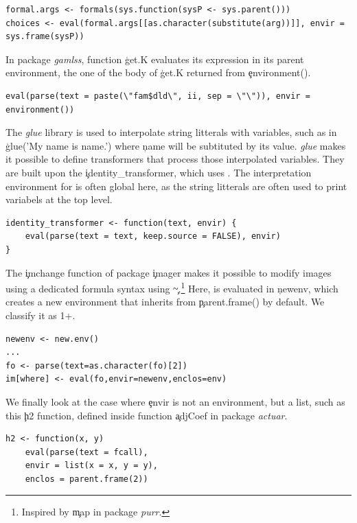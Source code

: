 \documentclass[conference]{IEEEtran}
\begin{document}
\begin{lstlisting}[label=code:matchargenvir, caption={\c{match.arg} using \eval with a custom environment.}]
formal.args <- formals(sys.function(sysP <- sys.parent()))
choices <- eval(formal.args[[as.character(substitute(arg))]], envir = sys.frame(sysP))
\end{lstlisting}

In package \emph{gamlss}, function \c{get.K} evaluates its expression in its parent environment, the one of the body of \c{get.K} returned from \c{environment()}.

\begin{lstlisting}
eval(parse(text = paste(\"fam$dld\", ii, sep = \"\")), envir = environment())
\end{lstlisting}


The \emph{glue} library is used to interpolate string litterals with variables, such as in \c{glue('My name is {name}.')} where \c{name} will be subtituted by its value. \emph{glue} makes it possible to define transformers that process those interpolated variables. They are built upon the \c{identity_transformer}, which uses \eval. The interpretation environment for \eval is often global here, as the string litterals are often used to print variabels at the top level.

\begin{lstlisting}
identity_transformer <- function(text, envir) {
    eval(parse(text = text, keep.source = FALSE), envir)
}
\end{lstlisting}


The \c{imchange} function of package \c{imager} makes it possible to modify images using a dedicated formula syntax using \c{\~}.\footnote{Inspired by \c{map} in package \emph{purr}.}  Here, \eval is evaluated in \c{newenv}, which creates a new environment that inherits from \c{parent.frame()} by default. We classify it as 1+.


\begin{lstlisting}
newenv <- new.env()
...
fo <- parse(text=as.character(fo)[2])
im[where] <- eval(fo,envir=newenv,enclos=env)
\end{lstlisting}

We finally look at the case where \c{envir} is not an environment, but a list, such as this \c{h2} function, defined inside function \c{adjCoef} in package \emph{actuar}.

\begin{lstlisting}
h2 <- function(x, y)
    eval(parse(text = fcall),
    envir = list(x = x, y = y),
    enclos = parent.frame(2))
\end{lstlisting}
\end{document}
